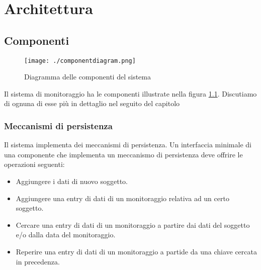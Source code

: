 
\chapter{Architettura}



\section{Componenti}

\begin{figure}
  \centering
  \texttt{[image: ./componentdiagram.png]}
  \caption{Diagramma delle componenti del sistema}
  \label{componentiSistemaArchitettura}
\end{figure}

Il sistema di monitoraggio ha le componenti illustrate nella figura \ref{componentiSistemaArchitettura}. Discutiamo di ognuna di esse pi\`u in dettaglio nel seguito del capitolo

\subsection{Meccanismi di persistenza}

Il sistema implementa dei meccanismi di persistenza. Un interfaccia minimale di una componente che implementa un meccanismo di persistenza deve offrire le operazioni seguenti:
\begin{itemize}
  \item 
    Aggiungere i dati di nuovo soggetto.
  \item
    Aggiungere una entry di dati di un monitoraggio relativa ad un certo soggetto.
  \item
    Cercare una entry di dati di un monitoraggio a partire dai dati del soggetto e/o dalla data del monitoraggio.
  \item
    Reperire una entry di dati di un monitoraggio a partide da una chiave cercata in precedenza.
\end{itemize}

